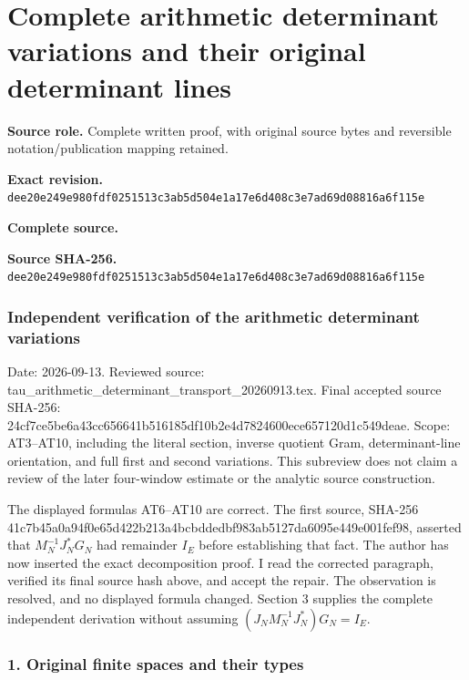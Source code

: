 \begingroup

\section{Complete arithmetic determinant variations and their original determinant lines}


\begingroup
\sloppy
\small

\noindent\textbf{Source role.} Complete written proof, with original source bytes and reversible notation/publication mapping retained.\par
\noindent\textbf{Exact revision.} \nolinkurl{dee20e249e980fdf0251513c3ab5d504e1a17e6d408c3e7ad69d08816a6f115e}\par
\noindent\textbf{Complete source.} \par
\noindent\textbf{Source SHA-256.} \nolinkurl{dee20e249e980fdf0251513c3ab5d504e1a17e6d408c3e7ad69d08816a6f115e}\par\medskip
\subsubsection{Independent verification of the arithmetic determinant variations}\label{endpoint-variation_review--independent-verification-of-the-arithmetic-determinant-variations}

Date: 2026-09-13. Reviewed source: tau\_arithmetic\_determinant\_transport\_20260913.tex. Final accepted source SHA-256: 24cf7ce5be6a43cc656641b516185df10b2e4d7824600ece657120d1c549deae. Scope: AT3--AT10, including the literal section, inverse quotient Gram, determinant-line orientation, and full first and second variations. This subreview does not claim a review of the later four-window estimate or the analytic source construction.

The displayed formulas AT6--AT10 are correct. The first source, SHA-256 41c7b45a0a94f0e65d422b213a4bcbddedbf983ab5127da6095e449e001fef98, asserted that \(M_N^{-1}J_N^*G_N\) had remainder \(I_E\) before establishing that fact. The author has now inserted the exact decomposition proof. I read the corrected paragraph, verified its final source hash above, and accept the repair. The observation is resolved, and no displayed formula changed. Section 3 supplies the complete independent derivation without assuming \((J_NM_N^{-1}J_N^*)G_N=I_E\).

\subsubsection{1. Original finite spaces and their types}\label{endpoint-variation_review--original-finite-spaces-and-their-types}


